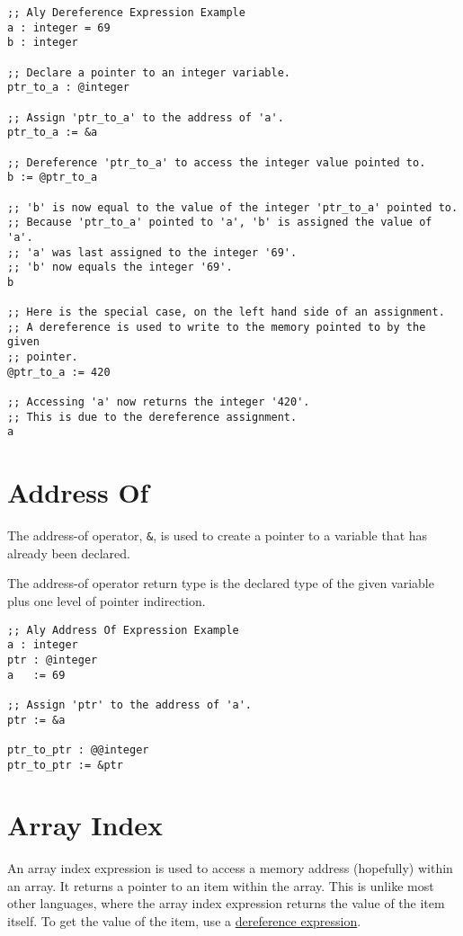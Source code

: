 \documentclass[12pt]{report}
\begin{document}
\begin{Verbatim}[samepage=true]
;; Aly Dereference Expression Example
a : integer = 69
b : integer

;; Declare a pointer to an integer variable.
ptr_to_a : @integer

;; Assign 'ptr_to_a' to the address of 'a'.
ptr_to_a := &a

;; Dereference 'ptr_to_a' to access the integer value pointed to.
b := @ptr_to_a

;; 'b' is now equal to the value of the integer 'ptr_to_a' pointed to.
;; Because 'ptr_to_a' pointed to 'a', 'b' is assigned the value of 'a'.
;; 'a' was last assigned to the integer '69'.
;; 'b' now equals the integer '69'.
b

;; Here is the special case, on the left hand side of an assignment.
;; A dereference is used to write to the memory pointed to by the given
;; pointer.
@ptr_to_a := 420

;; Accessing 'a' now returns the integer '420'.
;; This is due to the dereference assignment.
a
\end{Verbatim}

\section{Address Of}
\label{subsec:expressions-address-of}

The address-of operator, \verb|&|, is used to create a pointer to a variable that has already been declared.

The address-of operator return type is the declared type of the given variable plus one level of pointer indirection.

\begin{Verbatim}[samepage=true]
;; Aly Address Of Expression Example
a : integer
ptr : @integer
a   := 69

;; Assign 'ptr' to the address of 'a'.
ptr := &a

ptr_to_ptr : @@integer
ptr_to_ptr := &ptr
\end{Verbatim}

\section{Array Index}
\label{subsec:expressions-array-index}

An array index expression is used to access a memory address (hopefully) within an array. It returns a pointer to an item within the array. This is unlike most other languages, where the array index expression returns the value of the item itself. To get the value of the item, use a \hyperref[subsec:expressions-dereference]{dereference expression}.
\end{document}
